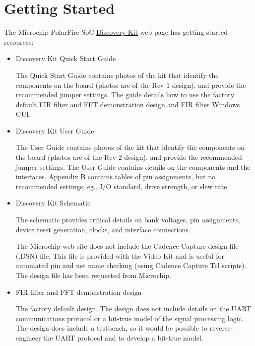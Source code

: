 \section{Getting Started}
\label{sec:getting_started}

The Microchip PolarFire SoC
\href{https://www.microchip.com/en-us/development-tool/mpfs-disco-kit}
{Discovery Kit} web page has getting started resources:
%
\begin{itemize}
\item Discovery Kit Quick Start Guide~\cite{Microchip_DISCO_QS_2024}

The Quick Start Guide contains photos of the kit that identify the components
on the board (photos are of the Rev 1 design), and provide the recommended
jumper settings. The guide details how to use the factory default FIR filter
and FFT demonstration design and FIR filter Windows GUI.

\item Discovery Kit User Guide~\cite{Microchip_DISCO_UG_2025}

The User Guide contains photos of the kit that identify the components
on the board (photos are of the Rev 2 design), and provide the recommended
jumper settings. The User Guide contains details on the components and
the interfaces. Appendix B contains tables of pin assignments, but no recommended
settings, eg., I/O standard, drive strength, or slew rate.

\item Discovery Kit Schematic~\cite{Microchip_DISCO_SCH_2023}

The schematic provides critical details on bank voltages, pin assignments,
device reset generation, clocks, and interface connections.

The Microchip web site does not include the Cadence Capture design file (.DSN)
file. This file is provided with the Video Kit and is useful for automated
pin and net name checking (using Cadence Capture Tcl scripts). The design
file has been requested from Microchip.

\item FIR filter and FFT demonstration design~\cite{Microchip_AN5165_2024}

The factory default design. The design does not include details on the UART
communications protocol or a bit-true model of the signal processing logic.
The design does include a testbench, so it would be possible to reverse-engineer
the UART protocol and to develop a bit-true model.


\end{itemize}
